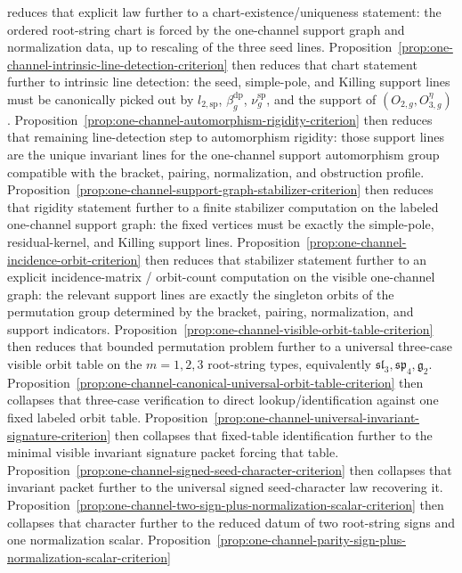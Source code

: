 \begin{remark}[Scope]
reduces that explicit law further to a chart-existence/uniqueness
statement: the ordered root-string chart is forced by the one-channel
support graph and normalization data, up to rescaling of the three seed
lines.
Proposition~\ref{prop:one-channel-intrinsic-line-detection-criterion}
then reduces that chart statement further to intrinsic line detection:
the seed, simple-pole, and Killing support lines must be canonically
picked out by $l_{2,\mathrm{sp}}$, $\beta_g^{\mathrm{dp}}$,
$\nu_g^{\mathrm{sp}}$, and the support of
$(O_{2,g},O_{3,g}^\eta)$.
Proposition~\ref{prop:one-channel-automorphism-rigidity-criterion}
then reduces that remaining line-detection step to automorphism
rigidity: those support lines are the unique invariant lines for the
one-channel support automorphism group compatible with the bracket,
pairing, normalization, and obstruction profile.
Proposition~\ref{prop:one-channel-support-graph-stabilizer-criterion}
then reduces that rigidity statement further to a finite stabilizer
computation on the labeled one-channel support graph: the fixed
vertices must be exactly the simple-pole, residual-kernel, and Killing
support lines.
Proposition~\ref{prop:one-channel-incidence-orbit-criterion}
then reduces that stabilizer statement further to an explicit
incidence-matrix / orbit-count computation on the visible one-channel
graph: the relevant support lines are exactly the singleton orbits of
the permutation group determined by the bracket, pairing,
normalization, and support indicators.
Proposition~\ref{prop:one-channel-visible-orbit-table-criterion}
then reduces that bounded permutation problem further to a universal
three-case visible orbit table on the
$m=1,2,3$ root-string types, equivalently
$\mathfrak{sl}_3,\mathfrak{sp}_4,\mathfrak{g}_2$.
Proposition~\ref{prop:one-channel-canonical-universal-orbit-table-criterion}
then collapses that three-case verification to direct
lookup/identification against one fixed labeled orbit table.
Proposition~\ref{prop:one-channel-universal-invariant-signature-criterion}
then collapses that fixed-table identification further to the minimal
visible invariant signature packet forcing that table.
Proposition~\ref{prop:one-channel-signed-seed-character-criterion}
then collapses that invariant packet further to the universal signed
seed-character law recovering it.
Proposition~\ref{prop:one-channel-two-sign-plus-normalization-scalar-criterion}
then collapses that character further to the reduced datum of two
root-string signs and one normalization scalar.
Proposition~\ref{prop:one-channel-parity-sign-plus-normalization-scalar-criterion}

\end{remark}
